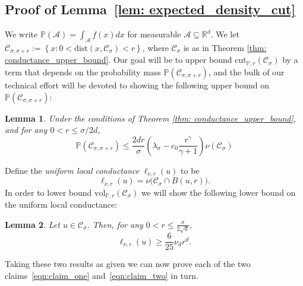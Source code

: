 \documentclass[11pt,twoside]{article}
\newtheorem{lemma}{Lemma}
\newcommand{\set}[1]{\left\{#1\right\}}
\newcommand{\vol}{\mathrm{vol}}
\newcommand{\cut}{\mathrm{cut}}
\newcommand{\Reals}{\mathbb{R}}
\newcommand{\Rd}{\Reals^d}
\newcommand{\1}{\mathbf{1}}
\newcommand{\dist}{\mathrm{dist}}
\newcommand{\Xbf}{X}             %
\newcommand{\Pbb}{\mathbb{P}}
\newcommand{\Cset}{\mathcal{C}}
\newcommand{\Aset}{\mathcal{A}}
\newcommand{\Csig}{\Cset_{\sigma}}
\newcommand{\Csigr}{\Cset_{\sigma,\sigma + r}}
\begin{document}
\subsection{Proof of Lemma~\ref{lem: expected_density_cut}}
We write $\Pbb(\Aset) = \int_{\Aset} f(x) dx$ for measurable $\Aset \subseteq \Rd$.
We 
let $\Csigr := \set{x: 0 < \dist(x, \Csig) < r}$, where $\Csig$ is as in Theorem \ref{thm: conductance_upper_bound}. 
Our goal will be to upper bound $\cut_{\Pbb,r}(\Csig)$ by a term that depends on the probability mass $\Pbb(\Csigr)$, 
and the bulk of our technical effort will be devoted to showing the following upper bound on $\Pbb(\Csigr)$:
\begin{lemma}
	\label{lem: expected_number_boundary_points}
	Under the conditions of Theorem \ref{thm: conductance_upper_bound}, and for any $0 < r \leq \sigma/2d$,
	\begin{equation*}
	\Pbb(\Csigr) \leq \frac{2dr}{\sigma} \left(\lambda_{\sigma} - c_0\frac{r^{\gamma}}{\gamma + 1}\right) \nu(\Csig)
	\end{equation*}	
\end{lemma}
\noindent Define the \emph{uniform local conductance} $\ell_{\nu,r}(u)$ to be
\begin{equation*}
\ell_{\nu,r}(u) = \nu\bigl(\Csig \cap B(u,r)\bigr).
\end{equation*}
In order to lower bound $\vol_{\Pbb,r}(\Csig)$ we will show the following lower bound on the uniform local conductance:
\begin{lemma}
	\label{lem: local_conductance}
	Let $u \in \Csig$. Then, for any $0 < r \leq \frac{\sigma}{2\sqrt{d}}$,
	\begin{equation*}
	\ell_{\nu,r}(u) \geq \frac{6}{25} \nu_d r^d.
	\end{equation*}
\end{lemma}
Taking these two results as given we can now prove each of the two claims~\eqref{eqn:claim_one} and~\eqref{eqn:claim_two} in turn.
\end{document}
